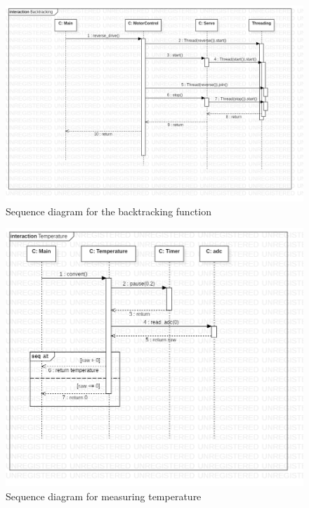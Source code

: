 \documentclass[12pt]{article}
\begin{document}
 	\begin{figure}[H]
 		\includegraphics[width=\linewidth]{SequenceDiagram4.png}
 		\caption{Sequence diagram for the backtracking function}
 	\end{figure}
	 \begin{figure}[H]
	 	\includegraphics[width=\linewidth]{SequenceDiagram5.png}
	 	\caption{Sequence diagram for measuring temperature}
	 \end{figure}	
\end{document}
